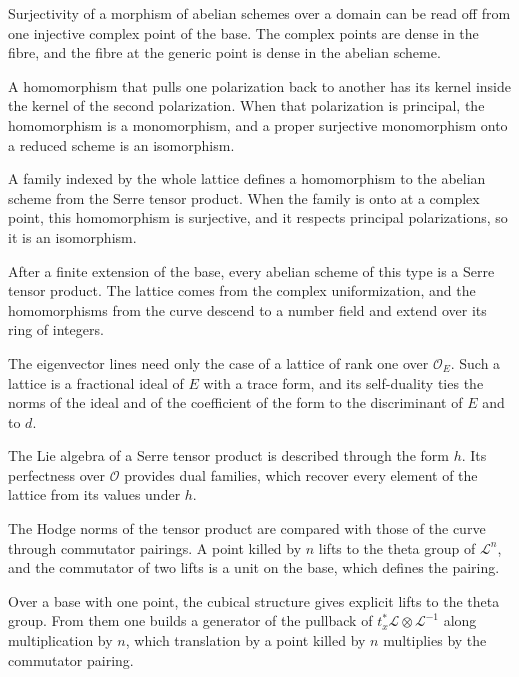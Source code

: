 Surjectivity of a morphism of abelian schemes over a domain can be read off from one injective complex point of the
base. The complex points are dense in the fibre, and the fibre at the generic point is dense in the abelian scheme.

A homomorphism that pulls one polarization back to another has its kernel inside the kernel of the second
polarization. When that polarization is principal, the homomorphism is a monomorphism, and a proper surjective
monomorphism onto a reduced scheme is an isomorphism.

A family indexed by the whole lattice defines a homomorphism to the abelian scheme from the Serre tensor product. When
the family is onto at a complex point, this homomorphism is surjective, and it respects principal polarizations, so it
is an isomorphism.

After a finite extension of the base, every abelian scheme of this type is a Serre tensor product. The lattice comes
from the complex uniformization, and the homomorphisms from the curve descend to a number field and extend over its
ring of integers.

The eigenvector lines need only the case of a lattice of rank one over $\mathcal O_E$. Such a lattice is a fractional
ideal of $E$ with a trace form, and its self-duality ties the norms of the ideal and of the coefficient of the form to
the discriminant of $E$ and to $d$.

The Lie algebra of a Serre tensor product is described through the form $h$. Its perfectness over $\mathcal O$
provides dual families, which recover every element of the lattice from its values under $h$.

The Hodge norms of the tensor product are compared with those of the curve through commutator pairings. A point killed
by $n$ lifts to the theta group of $\mathcal L^n$, and the commutator of two lifts is a unit on the base, which defines
the pairing.

Over a base with one point, the cubical structure gives explicit lifts to the theta group. From them one builds a
generator of the pullback of $t_x^*\mathcal L\otimes\mathcal L^{-1}$ along multiplication by $n$, which translation by a
point killed by $n$ multiplies by the commutator pairing.

